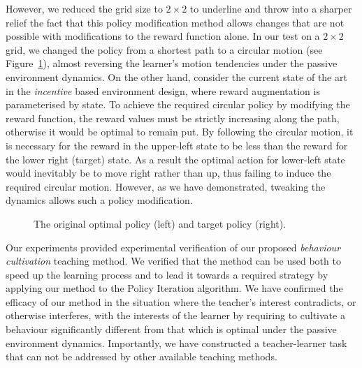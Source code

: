 However, we reduced the grid size to $2\times 2$ to underline and throw
into a sharper relief the fact that this policy modification method
allows changes that are not possible with modifications to the reward
function alone. In our test on a $2 \times 2$ grid, we changed the
policy from a shortest path to a circular motion (see
Figure~\ref{envdopt}), almost reversing the learner's motion
tendencies under the passive environment dynamics. On the other hand,
consider the current state of the art in the {\em incentive} based
environment design, where reward augmentation is parameterised by
state. To achieve the required circular policy by modifying the reward
function, the reward values must be strictly increasing along the
path, otherwise it would be optimal to remain put. By following the
circular motion, it is necessary for the reward in the upper-left
state to be less than the reward for the lower right (target)
state. As a result the optimal action for lower-left state would
inevitably be to move right rather than up, thus failing to induce the
required circular motion. However, as we have demonstrated, tweaking
the dynamics allows such a policy modification.

\begin{figure}[ht]
\centerline{}
\caption{\label{envdopt}The original optimal policy (left) and target policy (right).}
\end{figure}

Our experiments provided experimental verification of our proposed
{\em behaviour cultivation} teaching method.  We verified that the
method can be used both to speed up the learning process and to lead
it towards a required strategy by applying our method to the Policy
Iteration algorithm. We have confirmed the efficacy of our method in
the situation where the teacher's interest contradicts, or otherwise
interferes, with the interests of the learner by requiring to
cultivate a behaviour significantly different from that which is
optimal under the passive environment dynamics. Importantly, we have
constructed a teacher-learner task that can not be addressed by other
available teaching methods.
